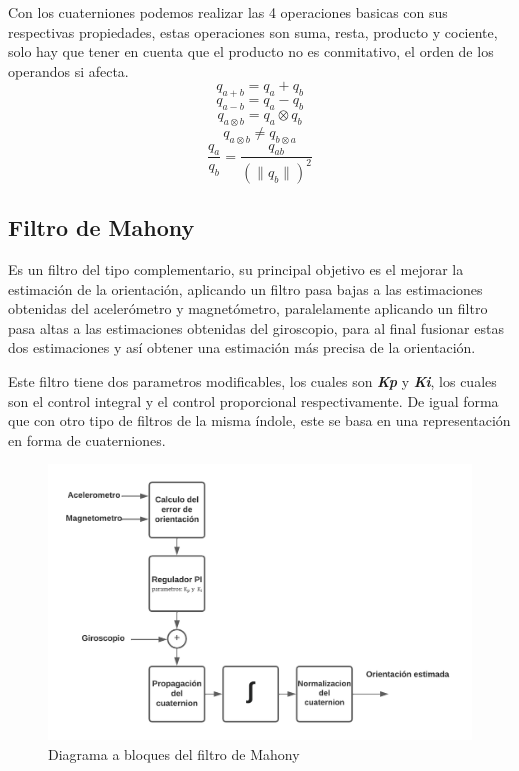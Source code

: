 \documentclass[conference]{IEEEtran}
\providecommand{\norm}[1]{\lVert#1\rVert}
\begin{document}
        Con los cuaterniones podemos realizar las 4 operaciones basicas con sus respectivas propiedades, estas operaciones son
        suma, resta, producto y cociente, solo hay que tener en cuenta que el producto no es conmitativo, el orden de los operandos
        si afecta.
        $$  q_{a+b} = q_a + q_b $$
        $$  q_{a-b} = q_a - q_b $$
        $$  q_{a \otimes b} = q_a \otimes q_b $$
        $$  q_{a \otimes b} \neq q_{b \otimes a}  $$
        $$  \frac{q_a}{q_b} = \frac{q_{ab}}{(\norm{q_b})^2} $$

    \subsection{Filtro de Mahony}
    Es un filtro del tipo complementario, su principal objetivo es el mejorar la estimación de la orientación, aplicando un filtro pasa bajas a las estimaciones obtenidas del acelerómetro y magnetómetro, paralelamente aplicando un filtro pasa altas a las estimaciones obtenidas del giroscopio, para al final fusionar estas dos estimaciones y así obtener una estimación más precisa de la orientación. 
    
    Este filtro tiene dos parametros modificables, los cuales son \textbf{\textit{Kp}} y \textbf{\textit{Ki}}, los cuales son el control integral y el control proporcional respectivamente. De igual forma que con otro tipo de filtros de la misma índole, este se basa en una representación en forma de cuaterniones.
    \begin{figure}[htp]
        \centering
             \includegraphics[width=\columnwidth]{mahony_block_diagram_vertical.png}
              \caption{Diagrama a bloques del filtro de Mahony}
    \end{figure}
    \FloatBarrier 
\end{document}
